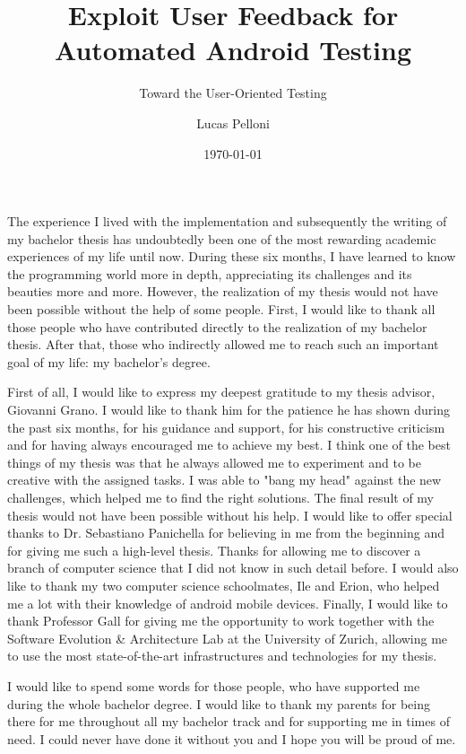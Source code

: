 \documentclass{seal_thesis}
\date{\today}
\title{Exploit User Feedback \vspace{0.25em} for Automated  Android Testing}
\subtitle{Toward the User-Oriented Testing}
\author{Lucas Pelloni}
\begin{document}
\maketitle



\frontmatter




\begin{acknowledgements}
The experience I lived with the implementation and subsequently the writing of my bachelor thesis has undoubtedly been one of the most rewarding academic experiences of my life until now. During these six months, I have learned to know the programming world more in depth, appreciating its challenges and its beauties more and more. However, the realization of my thesis would not have been possible without the help of some people. First, I would like to thank all those people who have contributed directly to the realization of my bachelor thesis. After that, those who indirectly allowed me to reach such an important goal of my life: my bachelor’s degree. 

First of all, I would like to express my deepest gratitude to my thesis advisor, Giovanni Grano. I would like to thank him for the patience he has shown during the past six months, for his guidance and support, for his constructive criticism and for having always encouraged me to achieve my best. I think one of the best things of my thesis was that he always allowed me to experiment and to be creative with the assigned tasks. I was able to "bang my head" against the new challenges, which helped me to find the right solutions. The final result of my thesis would not have been possible without his help. I would like to offer special thanks to Dr. Sebastiano Panichella for believing in me from the beginning and for giving me such a high-level thesis. Thanks for allowing me to discover a branch of computer science that I did not know in such detail before. I would also like to thank my two computer science schoolmates, Ile and Erion, who helped me a lot with their knowledge of android mobile devices. Finally, I would like to thank Professor Gall for giving me the opportunity to work together with the Software Evolution \& Architecture Lab at the University of Zurich, allowing me to use the most state-of-the-art infrastructures and technologies for my thesis. 

I would like to spend some words for those people, who have supported me during the whole bachelor degree. I would like to thank my parents for being there for me throughout all my bachelor track and for supporting me in times of need. I could never have done it without you and I hope you will be proud of me. 
\end{acknowledgements}
\end{document}
